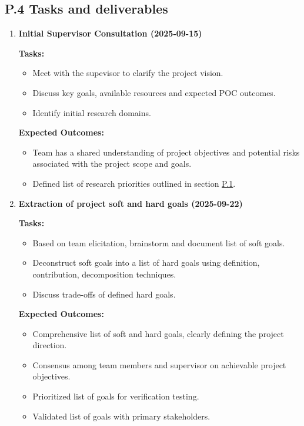 \documentclass[12pt]{article}
\theoremstyle{definition}
\begin{document}
\subsection{P.4 Tasks and deliverables}

\begin{enumerate}

  \item \textbf{Initial Supervisor Consultation (2025-09-15)}  

  \textbf{Tasks:}
  \begin{itemize}
      \item Meet with the supevisor to clarify the project vision. 
      \item Discuss key goals, available resources and expected POC outcomes. 
      \item Identify initial research domains. 
  \end{itemize}

  \textbf{Expected Outcomes:}
  \begin{itemize}
      \item Team has a shared understanding of project objectives and potential
       risks associated with the project scope and goals. 
      \item Defined list of research priorities outlined in section
      \hyperref[item: p1]{P.1}.
  \end{itemize}

  \vspace{0.8em}

  \item \textbf{Extraction of project soft and hard goals (2025-09-22)}  

  \textbf{Tasks:}
  \begin{itemize}
      \item Based on team elicitation, brainstorm and document list of soft 
      goals. 
      \item Deconstruct soft goals into a list of hard goals using definition,
       contribution, decomposition techniques. 
      \item Discuss trade-offs of defined hard goals. 
  \end{itemize}

  \textbf{Expected Outcomes:}
  \begin{itemize}
      \item Comprehensive list of soft and hard goals, clearly defining the 
      project direction. 
      \item Consensus among team members and supervisor on achievable project
       objectives. 
      \item Prioritized list of goals for verification testing. 
      \item Validated list of goals with primary stakeholders. 
  \end{itemize}


\end{enumerate}
\end{document}

